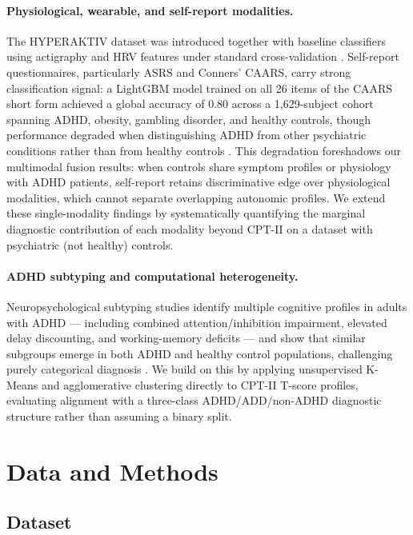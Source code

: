 \documentclass[11pt]{article}
\begin{document}
\paragraph{Physiological, wearable, and self-report modalities.} The HYPERAKTIV dataset was introduced together with baseline classifiers using actigraphy and HRV features under standard cross-validation \citep{hicks2021hyperaktiv}. Self-report questionnaires, particularly ASRS and Conners' CAARS, carry strong classification signal: a LightGBM model trained on all 26 items of the CAARS short form achieved a global accuracy of 0.80 across a 1{,}629-subject cohort spanning ADHD, obesity, gambling disorder, and healthy controls, though performance degraded when distinguishing ADHD from other psychiatric conditions rather than from healthy controls \citep{christiansen2020machine}. This degradation foreshadows our multimodal fusion results: when controls share symptom profiles or physiology with ADHD patients, self-report retains discriminative edge over physiological modalities, which cannot separate overlapping autonomic profiles. We extend these single-modality findings by systematically quantifying the marginal diagnostic contribution of each modality beyond CPT-II on a dataset with psychiatric (not healthy) controls.

\paragraph{ADHD subtyping and computational heterogeneity.} Neuropsychological subtyping studies identify multiple cognitive profiles in adults with ADHD --- including combined attention/inhibition impairment, elevated delay discounting, and working-memory deficits --- and show that similar subgroups emerge in both ADHD and healthy control populations, challenging purely categorical diagnosis \citep{mostert2018similar}. We build on this by applying unsupervised K-Means and agglomerative clustering directly to CPT-II T-score profiles, evaluating alignment with a three-class ADHD/ADD/non-ADHD diagnostic structure rather than assuming a binary split.

\section{Data and Methods}

\subsection{Dataset}
\end{document}
